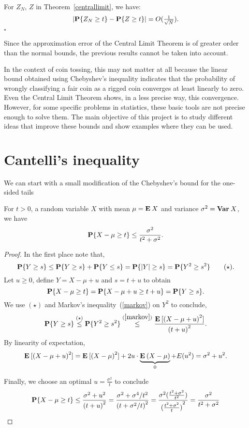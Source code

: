 \begin{theorem}\label{berryessen}
  For $Z_N$, $Z$ in Theorem~\ref{centrallimit}, we have:
  \[ \left|\P\{Z_N \geq t\} - \P\{Z \geq t\}\right| = O(\tfrac{1}{\sqrt{N}}). \]
  \hfill $\square$
\end{theorem}

Since the approximation error of the Central Limit Theorem is of greater order than the normal bounds, the previous results cannot be taken into account.

\vspace*{1em}

In the context of coin tossing, this may not matter at all because the linear bound obtained using Chebyshev's inequality indicates that the probability of wrongly classifying a fair coin as a rigged coin converges at least linearly to zero. Even the Central Limit Theorem shows, in a less precise way, this convergence. However, for some specific problems in statistics, these basic tools are not precise enough to solve them. The main objective of this project is to study different ideas that improve these bounds and show examples where they can be used.

\section{Cantelli's inequality}
We can start with a small modification of the Chebyshev's bound for the one-sided tails

\begin{theorem}\label{cantelli}
  For $t > 0$, a random variable $X$ with mean $\mu = \E X$ and variance $\sigma^2 = \Var X$, we have
  \[ \P\{X-\mu \geq t\} \leq \frac{\sigma^2}{t^2 + \sigma^2}. \] 
\end{theorem}

\begin{proof}
  In the first place note that,
  \[ \P\{ Y \geq s\} \leq \P\{ Y \geq s\} + \P\{ Y \leq s\} = \P\{|Y| \geq s\} = \P\{ Y^2 \geq s^2\} \tag*{($\star$)}. \] 
  Let $u \geq 0$, define $Y = X-\mu + u$ and $s = t+u$ to obtain
  \[ \P\{X-\mu \geq t\} = \P\{X-\mu + u \geq t + u\} = \P\{Y \geq s\}. \]
  We use $(\star)$ and Markov's inequality~(\ref{markov}) on $Y^2$ to conclude,
  \[ \P\{Y \geq s\} \overset{(\star)}{\leq} \P\{ Y^2 \geq s^2\} \overset{(\ref{markov})}{\leq} \frac{\E[{(X-\mu+u)}^2]}{{(t+u)}^2}.\]
  By linearity of expectation,
  \[ \E[{(X-\mu+u)}^2] = \E[{(X-\mu)}^2] + 2u \cdot \underbrace{\E(X-\mu)}_{0} + E(u^2) = \sigma^2 + u^2. \]

  Finally, we choose an optimal $u = \frac{\sigma^2}{t}$ to conclude
  \[
    \P\{X-\mu \geq t\} \leq \frac{\sigma^2 + u^2}{{(t+u)}^2}
     = \frac{\sigma^2 + \sigma^4/t^2}{{{(t+\sigma^2/t)}^2}}
     = \frac{\sigma^2 (\tfrac{t^2+\sigma^2}{t^2})}{{(\tfrac{t^2+\sigma^2}{t})}^2}
     = \frac{\sigma^2}{t^2+\sigma^2}\]
\end{proof}

